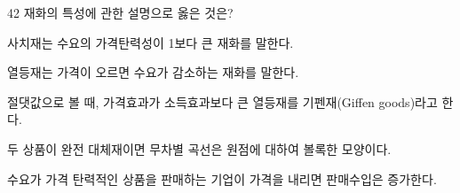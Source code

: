 \begin{question}{42}
재화의 특성에 관한 설명으로 옳은 것은?
\begin{choices}
  \item 사치재는 수요의 가격탄력성이 1보다 큰 재화를 말한다.
  \item 열등재는 가격이 오르면 수요가 감소하는 재화를 말한다.
  \item 절댓값으로 볼 때, 가격효과가 소득효과보다 큰 열등재를 기펜재(Giffen goods)라고 한다.
  \item 두 상품이 완전 대체재이면 무차별 곡선은 원점에 대하여 볼록한 모양이다.
  \item 수요가 가격 탄력적인 상품을 판매하는 기업이 가격을 내리면 판매수입은 증가한다.
\end{choices}
\end{question}
